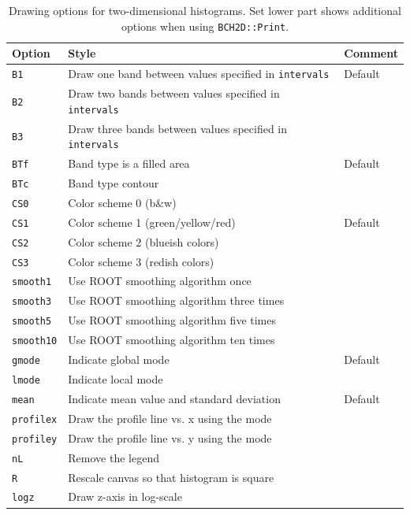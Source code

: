\documentclass[11pt, a4paper]{article}
\begin{document}
\begin{table}[ht!]
\caption{Drawing options for two-dimensional histograms. Set lower
  part shows additional options when using \texttt{BCH2D::Print}.
\label{table:draw2d}}
\begin{center}
\begin{tabular}{@{}lll@{}}
\toprule
Option & Style & Comment \\
\midrule
\verb|B1| & Draw one band between values specified in \verb|intervals| & Default  \\
\verb|B2| & Draw two bands between values specified in \verb|intervals| & \\
\verb|B3| & Draw three bands between values specified in \verb|intervals| & \\
\verb|BTf| & Band type is a filled area & Default \\
\verb|BTc| & Band type contour & \\
\verb|CS0| & Color scheme 0 (b\&w) & \\
\verb|CS1| & Color scheme 1 (green/yellow/red) & Default  \\
\verb|CS2| & Color scheme 2 (blueish colors) &  \\
\verb|CS3| & Color scheme 3 (redish colors) & \\
\verb|smooth1| & Use ROOT smoothing algorithm once & \\
\verb|smooth3| & Use ROOT smoothing algorithm three times & \\
\verb|smooth5| & Use ROOT smoothing algorithm five times & \\
\verb|smooth10| & Use ROOT smoothing algorithm ten times & \\
\verb|gmode| & Indicate global mode & Default \\
\verb|lmode| & Indicate local mode &  \\
\verb|mean| & Indicate mean value and standard deviation & Default \\
\verb|profilex| & Draw the profile line vs. x using the mode & \\
\verb|profiley| & Draw the profile line vs. y using the mode & \\
\verb|nL| & Remove the legend &  \\
\midrule
\verb|R| & Rescale canvas so that histogram is square & \\
\verb|logz| & Draw z-axis in log-scale & \\
\bottomrule
\end{tabular}
\end{center}
\end{table}
\end{document}
